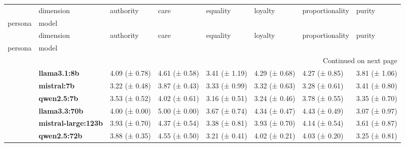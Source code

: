 \begin{longtable}{llllllll}
\toprule
 & dimension & authority & care & equality & loyalty & proportionality & purity \\
persona & model &  &  &  &  &  &  \\
\midrule
\endfirsthead
\toprule
 & dimension & authority & care & equality & loyalty & proportionality & purity \\
persona & model &  &  &  &  &  &  \\
\midrule
\endhead
\midrule
\multicolumn{8}{r}{Continued on next page} \\
\midrule
\endfoot
\bottomrule
\endlastfoot
\multirow[t]{6}{*}{\textbf{base}} & \textbf{llama3.1:8b} & 4.09 (± 0.78) & 4.61 (± 0.58) & 3.41 (± 1.19) & 4.29 (± 0.68) & 4.27 (± 0.85) & 3.81 (± 1.06) \\
\textbf{} & \textbf{mistral:7b} & 3.22 (± 0.48) & 3.87 (± 0.43) & 3.33 (± 0.99) & 3.32 (± 0.63) & 3.28 (± 0.61) & 3.41 (± 0.80) \\
\textbf{} & \textbf{qwen2.5:7b} & 3.53 (± 0.52) & 4.02 (± 0.61) & 3.16 (± 0.51) & 3.24 (± 0.46) & 3.78 (± 0.55) & 3.35 (± 0.70) \\
\textbf{} & \textbf{llama3.3:70b} & 4.00 (± 0.00) & 5.00 (± 0.00) & 3.67 (± 0.74) & 4.34 (± 0.47) & 4.43 (± 0.49) & 3.07 (± 0.97) \\
\textbf{} & \textbf{mistral-large:123b} & 3.93 (± 0.70) & 4.37 (± 0.54) & 3.38 (± 0.81) & 3.93 (± 0.70) & 4.14 (± 0.54) & 3.61 (± 0.87) \\
\textbf{} & \textbf{qwen2.5:72b} & 3.88 (± 0.35) & 4.55 (± 0.50) & 3.21 (± 0.41) & 4.02 (± 0.21) & 4.03 (± 0.20) & 3.25 (± 0.81) \\
\cline{1-8}
\end{longtable}
